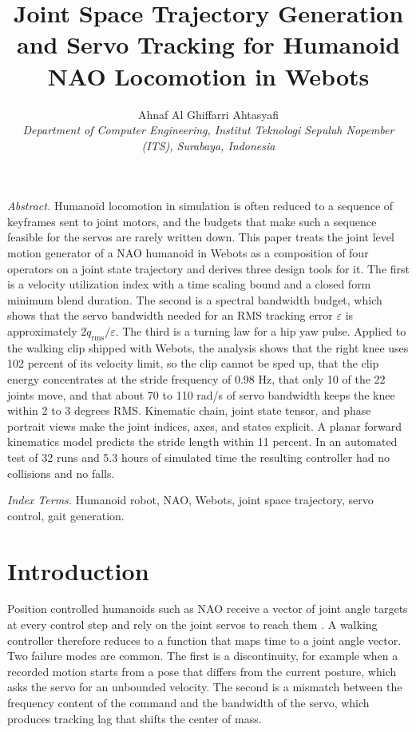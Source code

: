 \documentclass[10pt,journal]{IEEEtran}
\begin{document}
\setlength{\parindent}{0pt}
\setlength{\parskip}{5pt plus 1pt minus 1pt}
\setlength{\itemsep}{2pt}

\title{Joint Space Trajectory Generation and Servo Tracking for Humanoid NAO Locomotion in Webots}

\author{Ahnaf Al Ghiffarri Ahtasyafi\\
\textit{Department of Computer Engineering, Institut Teknologi Sepuluh Nopember (ITS), Surabaya, Indonesia}}

\maketitle
\thispagestyle{plain}

\noindent\textit{Abstract.} Humanoid locomotion in simulation is often reduced to a sequence of keyframes sent to joint motors, and the budgets that make such a sequence feasible for the servos are rarely written down. This paper treats the joint level motion generator of a NAO humanoid in Webots as a composition of four operators on a joint state trajectory and derives three design tools for it. The first is a velocity utilization index with a time scaling bound and a closed form minimum blend duration. The second is a spectral bandwidth budget, which shows that the servo bandwidth needed for an RMS tracking error $\varepsilon$ is approximately $2\dot q_{\mathrm{rms}}/\varepsilon$. The third is a turning law for a hip yaw pulse. Applied to the walking clip shipped with Webots, the analysis shows that the right knee uses 102 percent of its velocity limit, so the clip cannot be sped up, that the clip energy concentrates at the stride frequency of 0.98 Hz, that only 10 of the 22 joints move, and that about 70 to 110 rad/s of servo bandwidth keeps the knee within 2 to 3 degrees RMS. Kinematic chain, joint state tensor, and phase portrait views make the joint indices, axes, and states explicit. A planar forward kinematics model predicts the stride length within 11 percent. In an automated test of 32 runs and 5.3 hours of simulated time the resulting controller had no collisions and no falls.

\vspace{2pt}
\noindent\textit{Index Terms.} Humanoid robot, NAO, Webots, joint space trajectory, servo control, gait generation.

\section{Introduction}
Position controlled humanoids such as NAO receive a vector of joint angle targets at every control step and rely on the joint servos to reach them \cite{gouaillier2009}. A walking controller therefore reduces to a function that maps time to a joint angle vector. Two failure modes are common. The first is a discontinuity, for example when a recorded motion starts from a pose that differs from the current posture, which asks the servo for an unbounded velocity. The second is a mismatch between the frequency content of the command and the bandwidth of the servo, which produces tracking lag that shifts the center of mass.
\end{document}
